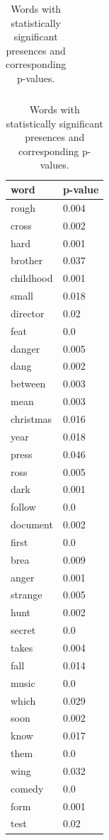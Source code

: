 \documentclass[12pt, oneside]{article}   	%
\begin{document}
\begin{table}
\begin{tabular}[t]{l|l}
\end{tabular}
\begin{tabular}[t]{l|l}
\textbf{word}        & \textbf{p-value} \\ \hline
rough       & 0.004    \\
cross       & 0.002    \\
hard        & 0.001    \\
brother     & 0.037    \\
childhood   & 0.001    \\
small       & 0.018    \\
director    & 0.02     \\
feat        & 0.0      \\
danger      & 0.005    \\
dang        & 0.002    \\
between     & 0.003    \\
mean        & 0.003    \\
christmas   & 0.016    \\
year        & 0.018    \\
press       & 0.046    \\
ross        & 0.005    \\
dark        & 0.001    \\
follow      & 0.0      \\
document    & 0.002    \\
first       & 0.0      \\
brea        & 0.009    \\
anger       & 0.001    \\
strange     & 0.005    \\
hunt        & 0.002    \\
secret      & 0.0      \\
takes       & 0.004    \\
fall        & 0.014    \\
music       & 0.0      \\
which       & 0.029    \\
soon        & 0.002    \\
know        & 0.017    \\
them        & 0.0      \\
wing        & 0.032    \\
comedy      & 0.0      \\
form        & 0.001    \\
test        & 0.02     \\
\end{tabular}
\caption{\label{table:word_p_values}Words with statistically significant presences and corresponding p-values.}
\end{table}
\end{document}
